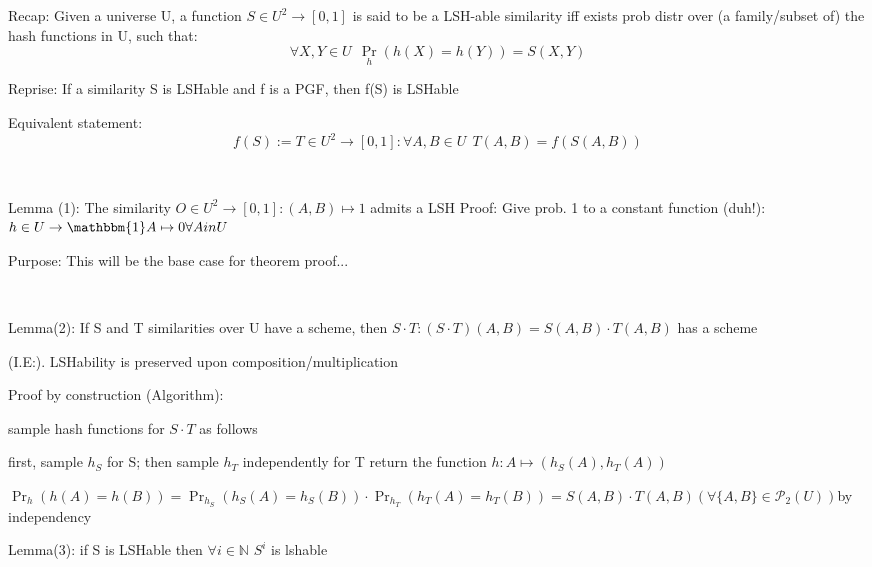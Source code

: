 \documentclass{report}
\begin{document}
	
	
	Recap: Given a universe U, a function $S \in U^2 \to [0, 1]$ is said to be a LSH-able similarity iff exists prob distr over (a family/subset of) the hash functions in U, such that: 
	\begin{equation}
	\forall X, Y \in U\ \ \Pr_h(h(X)=h(Y)) = S(X, Y)
	\end{equation}
	
	
	Reprise: If a similarity S is LSHable and f is a PGF, then f(S) is LSHable
	
	Equivalent statement:
	\begin{equation}
	f(S) := T \in U^2 \to [0, 1] : \forall A, B \in U\ \ T(A, B) = f(S(A, B))
	\end{equation}
	
	
	
	
	\
	
	Lemma (1): The similarity $O \in U^2 \to [0, 1] : (A, B) \mapsto 1$ admits a LSH
	Proof: Give prob. 1 to a constant function (duh!): $h \in U \to \mathbbm{1} A \mapsto 0 \forall A in U$
	
	Purpose: This will be the base case for theorem proof...
	
	
	\
	
	Lemma(2): If S and T similarities over U have a scheme, then $S \cdot T : (S \cdot T)(A, B) = S(A, B)\cdot T(A, B)$ has a scheme
	
	(I.E:). LSHability is preserved upon composition/multiplication
	
	Proof by construction (Algorithm): 
	
	sample hash functions for $S \cdot T$ as follows
	
	first, sample $h_S$ for S;
	then sample $h_T$ independently for T
	return the function $h : A \mapsto (h_S(A), h_T(A))$
	
	$\Pr_h(h(A)=h(B)) = \Pr_{h_S}(h_S(A)=h_S(B)) \cdot \Pr_{h_T}(h_T(A)=h_T(B)) = S(A, B) \cdot T(A, B) (\forall \{A, B\} \in \mathcal{P}_2(U))$by independency
	
	
	Lemma(3): if S is LSHable then $\forall i \in \mathbb{N}$ $S^i$ is lshable
	
\end{document}
